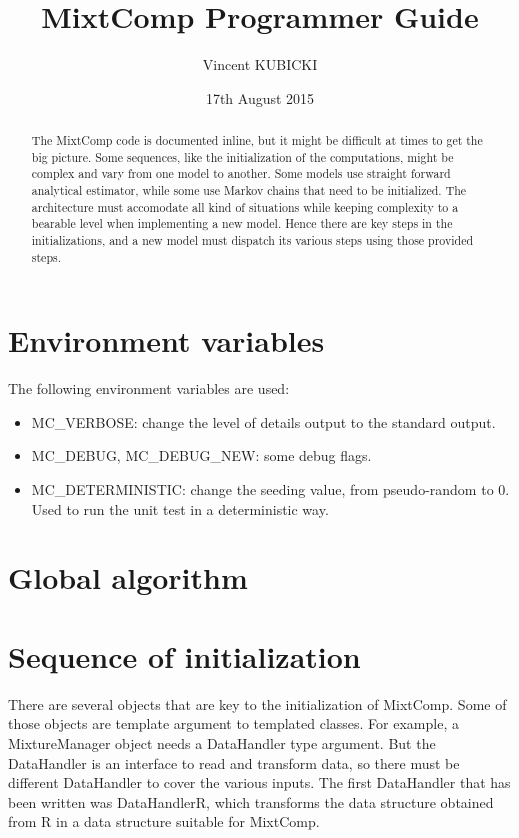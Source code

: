 \documentclass{article}
\title{MixtComp Programmer Guide}
\author{Vincent KUBICKI}
\date{17th August 2015}
\begin{document}
\maketitle
\tableofcontents

\begin{abstract}

The MixtComp code is documented inline, but it might be difficult at times to get the big picture. Some sequences, like the initialization of the computations, might be complex and vary from one model to another. Some models use straight forward analytical estimator, while some use Markov chains that need to be initialized. The architecture must accomodate all kind of situations while keeping complexity to a bearable level when implementing a new model. Hence there are key steps in the initializations, and a new model must dispatch its various steps using those provided steps.

\end{abstract}

\section{Environment variables}

The following environment variables are used:

\begin{itemize}
	\item MC_VERBOSE: change the level of details output to the standard output.
	\item MC_DEBUG, MC_DEBUG_NEW:  some debug flags.
	\item MC_DETERMINISTIC: change the seeding value, from pseudo-random to 0. Used to run the unit test in a deterministic way.
\end{itemize}

\section{Global algorithm}

\section{Sequence of initialization}

There are several objects that are key to the initialization of MixtComp. Some of those objects are template argument to templated classes. For example, a MixtureManager object needs a DataHandler type argument. But the DataHandler is an interface to read and transform data, so there must be different DataHandler to cover the various inputs. The first DataHandler that has been written was DataHandlerR, which transforms the data structure obtained from R in a data structure suitable for MixtComp.
\end{document}
